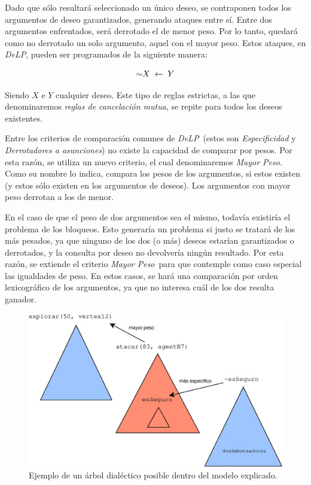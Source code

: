 \documentclass[oneside]{book}
\theoremstyle{definition}
\newcommand{\DLP}{\mbox{\textit{DeLP}}}
\newcommand{\no}{\mbox{$\sim$}}
\newcommand{\srule}[2]{\mbox{$ #1\;\leftarrow\;#2$}}
\newcommand{\nlA}[1]{$$\mbox{#1}$$}
\begin{document}
Dado que sólo resultará seleccionado un único deseo, se contraponen todos los argumentos 
de deseo garantizados, generando ataques entre sí. Entre dos argumentos enfrentados, será
derrotado el de menor peso. Por lo tanto, quedará como no derrotado un solo argumento, 
aquel con el mayor peso. Estos ataques, en \DLP, pueden ser programados de la 
siguiente manera:

\nlA{\srule{\no X}{Y}}

Siendo $X$ e $Y$ cualquier deseo. Este tipo de reglas estrictas, a las que
denominaremos \textit{reglas de cancelación mutua}, se repite para todos los 
deseos existentes.

Entre los criterios de comparación comunes de \DLP\ (estos son \textit{Especificidad} y 
\textit{Derrotadores a asunciones}) no existe la capacidad de comparar por pesos. 
Por esta razón, se utiliza un nuevo criterio, el cual 
denominaremos \textit{Mayor Peso}. Como su nombre lo indica, compara los pesos de los 
argumentos, si estos existen (y estos sólo existen en los argumentos de deseos). Los 
argumentos con mayor peso derrotan a los de menor.

En el caso de que el peso de dos argumentos sea el mismo, todavía existiría el problema 
de los bloqueos. Esto generaría un problema si justo se tratará de los más pesados, ya 
que ninguno de los dos (o más) deseos estarían garantizados o derrotados, y la consulta
por deseo no devolvería ningún resultado. Por esta razón, se extiende el criterio 
\textit{Mayor Peso}\ para que contemple como caso especial las igualdades de peso. En 
estos casos, se hará una comparación por orden lexicográfico de los argumentos, ya que
no interesa cuál de los dos resulta ganador. 

\begin{figure}
 \includegraphics[width=\textwidth]{mamarracho.eps}
 \caption{Ejemplo de un árbol dialéctico posible dentro del modelo explicado.}
 \label{fig:mamarracho}
\end{figure}
\end{document}
